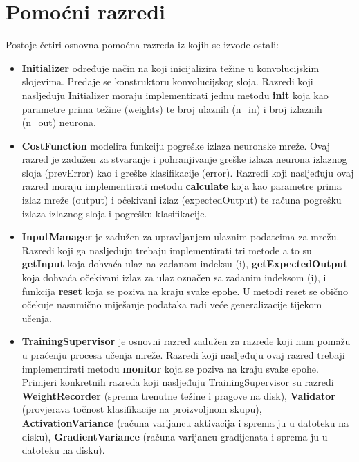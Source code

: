 \documentclass[times, utf8, zavrsni, numeric]{fer}
\begin{document}
\section{Pomoćni razredi}
Postoje četiri osnovna pomoćna razreda iz kojih se izvode ostali:
\begin{itemize}
\item \textbf{Initializer} određuje način na koji inicijalizira težine u konvolucijskim slojevima. Predaje se konstruktoru konvolucijskog sloja. Razredi koji nasljeđuju Initializer moraju implementirati jednu metodu \textbf{init} koja kao parametre prima težine (weights) te broj ulaznih (n\_in) i broj izlaznih (n\_out) neurona.
\item \textbf{CostFunction} modelira funkciju pogreške izlaza neuronske mreže. Ovaj razred je zadužen za stvaranje i pohranjivanje greške izlaza neurona izlaznog sloja (prevError) kao i greške klasifikacije (error). Razredi koji nasljeđuju ovaj razred moraju implementirati metodu \textbf{calculate} koja kao parametre prima izlaz mreže (output) i očekivani izlaz (expectedOutput) te računa pogrešku izlaza izlaznog sloja i pogrešku klasifikacije.
\item \textbf{InputManager} je zadužen za upravljanjem ulaznim podatcima za mrežu. Razredi koji ga nasljeđuju trebaju implementirati tri metode a to su \textbf{getInput} koja dohvaća ulaz na zadanom indeksu (i), \textbf{getExpectedOutput} koja dohvaća očekivani izlaz za ulaz označen sa zadanim indeksom (i), i funkcija \textbf{reset} koja se poziva na kraju svake epohe. U metodi reset se obično očekuje nasumično miješanje podataka radi veće generalizacije tijekom učenja.
\item \textbf{TrainingSupervisor} je osnovni razred zadužen za razrede koji nam pomažu u praćenju procesa učenja mreže. Razredi koji nasljeđuju ovaj razred trebaji implementirati metodu \textbf{monitor} koja se poziva na kraju svake epohe. Primjeri konkretnih razreda koji nasljeđuju TrainingSupervisor su razredi \textbf{WeightRecorder} (sprema trenutne težine i pragove na disk), \textbf{Validator} (provjerava točnost klasifikacije na proizvoljnom skupu), \textbf{ActivationVariance} (računa varijancu aktivacija i sprema ju u datoteku na disku), \textbf{GradientVariance} (računa varijancu gradijenata i sprema ju u datoteku na disku).
\end{itemize}
\end{document}
